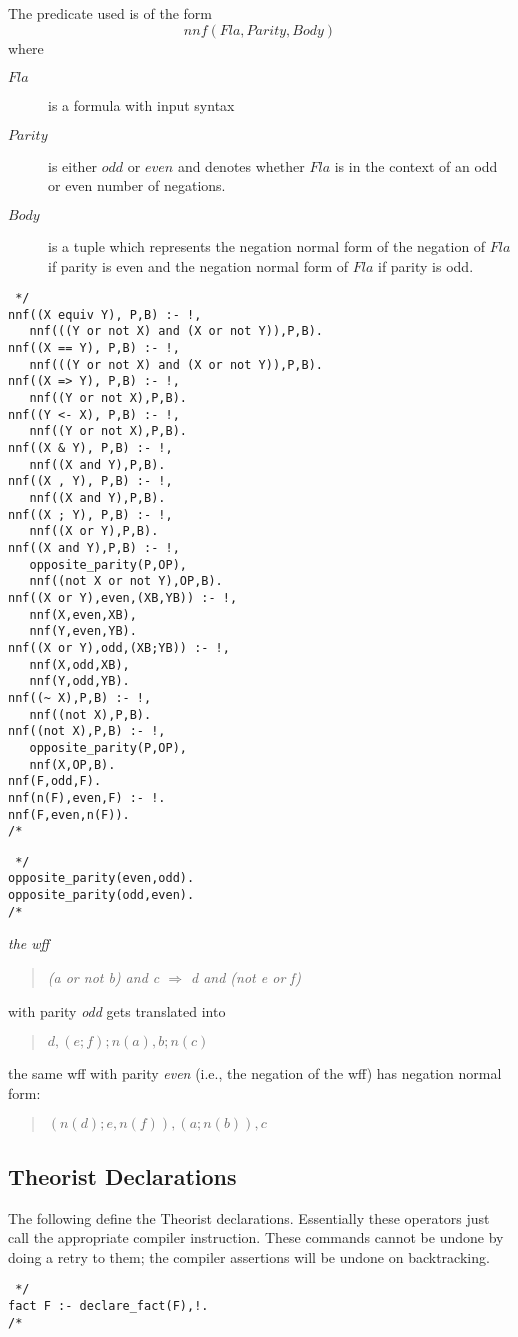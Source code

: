 The predicate used is of the form
\[nnf(Fla,Parity,Body)\]
where
\begin{description}
\item[$Fla$] is a formula with input syntax
\item[$Parity$] is either $odd$ or $even$ and denotes whether $Fla$ is
in the context of an odd or even number of negations.
\item[$Body$] is a tuple which represents the negation normal form
of the negation of $Fla$
if parity is even and the negation normal form of $Fla$ if parity is odd. 
\end{description}
\begin{verbatim} */
nnf((X equiv Y), P,B) :- !,
   nnf(((Y or not X) and (X or not Y)),P,B).
nnf((X == Y), P,B) :- !,
   nnf(((Y or not X) and (X or not Y)),P,B).
nnf((X => Y), P,B) :- !,
   nnf((Y or not X),P,B).
nnf((Y <- X), P,B) :- !,
   nnf((Y or not X),P,B).
nnf((X & Y), P,B) :- !,
   nnf((X and Y),P,B).
nnf((X , Y), P,B) :- !,
   nnf((X and Y),P,B).
nnf((X ; Y), P,B) :- !,
   nnf((X or Y),P,B).
nnf((X and Y),P,B) :- !,
   opposite_parity(P,OP),
   nnf((not X or not Y),OP,B).
nnf((X or Y),even,(XB,YB)) :- !,
   nnf(X,even,XB),
   nnf(Y,even,YB).
nnf((X or Y),odd,(XB;YB)) :- !,
   nnf(X,odd,XB),
   nnf(Y,odd,YB).
nnf((~ X),P,B) :- !,
   nnf((not X),P,B).
nnf((not X),P,B) :- !,
   opposite_parity(P,OP),
   nnf(X,OP,B).
nnf(F,odd,F).
nnf(n(F),even,F) :- !.
nnf(F,even,n(F)).
/* \end{verbatim}
\begin{verbatim} */
opposite_parity(even,odd).
opposite_parity(odd,even).
/* \end{verbatim}

\begin{example} \em
the wff
\begin{quote} \em
(a or not b) and c $\Rightarrow$ d and (not e or f)
\end{quote}
with parity {\em odd} gets translated into
\begin{quote}
$d,(e;f);n(a),b;n(c) $
\end{quote}
the same wff with parity {\em even} (i.e., the negation of the wff)
has negation normal form:
\begin{quote}
$(n(d);e,n(f)),(a;n(b)),c$
\end{quote}
\end{example}

\subsection{Theorist Declarations}
The following define the Theorist declarations.
Essentially these operators just call the appropriate compiler
instruction. These commands cannot be undone by doing a retry to them;
the compiler assertions will be undone on backtracking.
\begin{verbatim} */
fact F :- declare_fact(F),!.
/* \end{verbatim}

